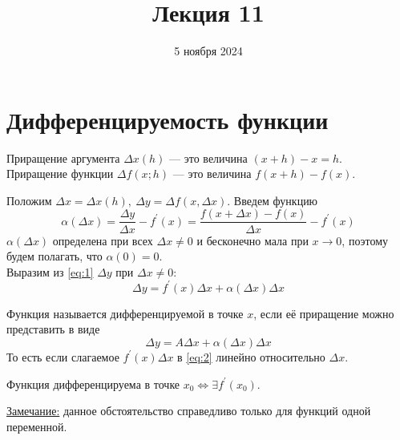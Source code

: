 \documentclass{article}
\title{Лекция 11}
\author{}
\date{5 ноября 2024}
\begin{document}
\maketitle

\section*{Дифференцируемость функции}

\begin{definition}
    Приращение аргумента \(\Delta x(h)\) --- это величина \((x + h) - x = h\).\\
    Приращение функции \(\Delta f(x; h)\) --- это величина \(f(x + h) - f(x)\).    
\end{definition}
\noindent
Положим \(\Delta x = \Delta x(h),\ \Delta y = \Delta f(x, \Delta x)\). Введем функцию
\begin{equation} \label{eq:1}
    \alpha(\Delta x) = \frac{\Delta y}{\Delta x} - f^{\prime}(x) = \frac{f(x + \Delta x) - f(x)}{\Delta x} - f^{\prime}(x)
\end{equation}
\(\alpha(\Delta x)\) определена при всех \(\Delta x \neq 0\) и бесконечно мала при \(x \to 0\), поэтому будем полагать, что \(\alpha(0) = 0\).\\
Выразим из \ref{eq:1} \(\Delta y\) при \(\Delta x \neq 0\):
\begin{equation} \label{eq:2}
    \Delta y = f^{\prime}(x)\Delta x + \alpha(\Delta x)\Delta x
\end{equation}

\begin{definition}
    Функция называется дифференцируемой в точке \(x\), если её приращение можно представить в виде
    \[
        \Delta y = A \Delta x + \alpha(\Delta x)\Delta x
    \] То есть если слагаемое \(f^{\prime}(x)\Delta x\)  в \ref{eq:2} линейно относительно \(\Delta x\).  
\end{definition}

\begin{claim}
    Функция дифференцируема в точке \(x_0 \iff \exists f^{\prime}(x_0)\). 
\end{claim}
\noindent
\underline{Замечание:} данное обстоятельство справедливо только для функций одной переменной.\\
\end{document}
